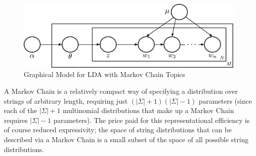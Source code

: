 \begin{figure}[h!]
\begin{centering}
    \includegraphics[width=\textwidth]{./lda_mm_plate.pdf}
\par\end{centering}
\caption{Graphical Model for LDA with Markov Chain Topics\label{fig:lda-graphical-markov}}
\end{figure}

A Markov Chain is a relatively compact way of specifying a distribution over strings of arbitrary length, requiring just $(|\Sigma| + 1)(|\Sigma| - 1)$ parameters (since each of the $|\Sigma| + 1$ multinomial distributions that make up a Markov Chain requires $|\Sigma| - 1$ parameters). The price paid for this representational efficiency is of course reduced expressivity; the space of string distributions that can be described via a Markov Chain is a small subset of the space of all possible string distributions.

